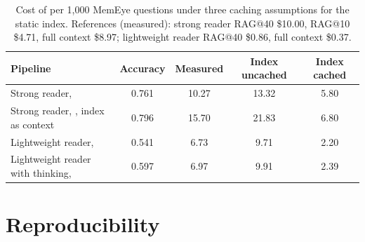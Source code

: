 \begin{table}[h]
\centering
\caption{Cost of \qss{} per 1,000 MemEye questions under three caching assumptions for the static index. References (measured): strong reader RAG@40 \$10.00, RAG@10 \$4.71, full context \$8.97; lightweight reader RAG@40 \$0.86, full context \$0.37.}
\label{tab:cost}
\small
\begin{tabular}{lcccc}
\toprule
Pipeline & Accuracy & Measured & Index uncached & Index cached \\
\midrule
Strong reader, \qss{} & 0.761 & 10.27 & 13.32 & 5.80 \\
Strong reader, \qss{}, index as context & 0.796 & 15.70 & 21.83 & 6.80 \\
Lightweight reader, \qss{} & 0.541 & 6.73 & 9.71 & 2.20 \\
Lightweight reader with thinking, \qss{} & 0.597 & 6.97 & 9.91 & 2.39 \\
\bottomrule
\end{tabular}
\end{table}

\section{Reproducibility}
\label{app:repro}

